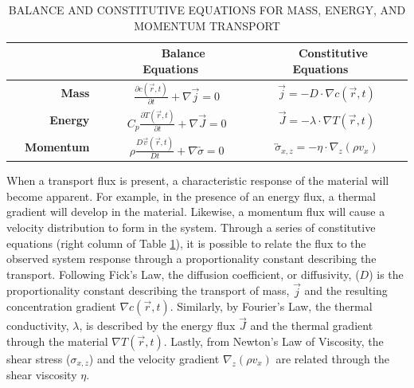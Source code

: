 \begin{table}
	\caption{BALANCE AND CONSTITUTIVE EQUATIONS FOR MASS, ENERGY, AND MOMENTUM TRANSPORT\label{tab:transport}}
        \begin{tabular}{rcc}
          \hline \hline
          & \textbf{~~Balance Equations~~} & \textbf{~~Constitutive Equations~~}\\ \hline 
          \textbf{~~Mass~~} & $\frac{\partial c (\vec{r}, t)}{\partial t} + \nabla \vec{j} = 0$ & $\vec{j} = -D \cdot \nabla c(\vec{r}, t)$\\
          \textbf{~~Energy~~} & $C_p \frac{\partial T (\vec{r}, t)}{\partial t} + \nabla \vec{J} = 0$ & $\vec{J} = -\lambda \cdot \nabla T(\vec{r}, t)$\\
          \textbf{~~Momentum~~} & $\rho \frac{D \vec{v}(\vec{r}, t)}{Dt}
                                  + \nabla \overleftrightarrow{\sigma} =
                                  0$ & $\overleftrightarrow{\sigma}_{x,z} = -\eta \cdot
                                       \nabla_z (\rho v_x)$\\ \hline
          \hline
          \end{tabular}
\end{table}

When a transport flux is present, a characteristic response of the
material will become apparent. For example, in the presence of an
energy flux, a thermal gradient will develop in the
material. Likewise, a momentum flux will cause a velocity distribution
to form in the system. Through a series of constitutive equations
(right column of Table \ref{tab:transport}), it is possible to relate
the flux to the observed system response through a proportionality
constant describing the transport.  Following Fick's Law, the
diffusion coefficient, or diffusivity, ($D$) is the proportionality
constant describing the transport of mass, $\vec{j}$ and the resulting
concentration gradient $\nabla c(\vec{r}, t)$. Similarly, by Fourier's
Law, the thermal conductivity, $\lambda$, is described by the energy
flux $\vec{J}$ and the thermal gradient through the material
$\nabla T(\vec{r}, t)$. Lastly, from Newton's Law of Viscosity, the
shear stress ($\sigma_{x,z}$) and the velocity gradient
$\nabla_z (\rho v_x)$ are related through the shear viscosity
$\eta$. 


